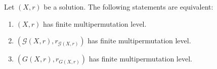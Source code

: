 \begin{theorem}\label{thm:multiG}
Let $(X,r)$ be a solution. The following statements are equivalent:
\begin{enumerate}
    \item $(X,r)$ has finite multipermutation level.
    \item $\left(\mathcal{G}(X,r),r_{\mathcal{G}(X,r)}\right)$ has finite multipermutation level.
    \item $\left(G(X,r),r_{G(X,r)}\right)$ has finite multipermutation level.
\end{enumerate}
\end{theorem}

